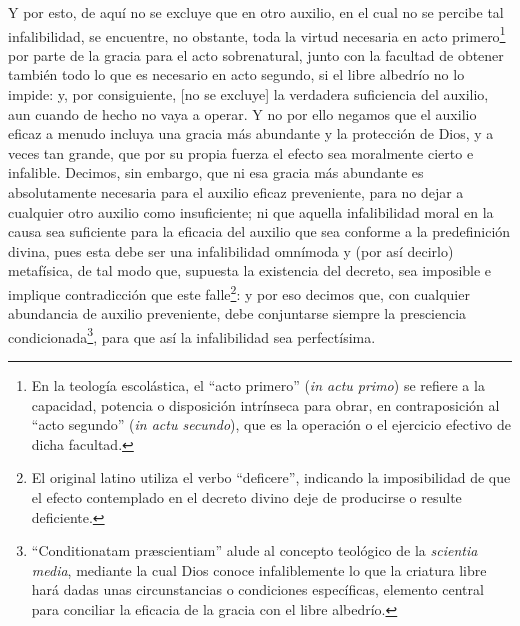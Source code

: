 \documentclass{article}
\begin{document}
Y por esto, de aquí no se excluye que en otro auxilio, en el cual no se percibe tal
infalibilidad, se encuentre, no obstante, toda la virtud necesaria en acto
primero\footnote{En la teología escolástica, el \enquote{acto primero} (\textit{in actu
primo}) se refiere a la capacidad, potencia o disposición intrínseca para obrar, en
contraposición al \enquote{acto segundo} (\textit{in actu secundo}), que es la operación
o el ejercicio efectivo de dicha facultad.} por parte de la gracia para el acto
sobrenatural, junto con la facultad de obtener también todo lo que es necesario en acto
segundo, si el libre albedrío no lo impide: y, por consiguiente, [no se excluye] la
verdadera suficiencia del auxilio, aun cuando de hecho no vaya a operar. Y no por ello
negamos que el auxilio eficaz a menudo incluya una gracia más abundante y la protección
de Dios, y a veces tan grande, que por su propia fuerza el efecto sea moralmente cierto
e infalible. Decimos, sin embargo, que ni esa gracia más abundante es absolutamente
necesaria para el auxilio eficaz preveniente, para no dejar a cualquier otro auxilio
como insuficiente; ni que aquella infalibilidad moral en la causa sea suficiente para la
eficacia del auxilio que sea conforme a la predefinición divina, pues esta debe ser una
infalibilidad omnímoda y (por así decirlo) metafísica, de tal modo que, supuesta la
existencia del decreto, sea imposible e implique contradicción que este
falle\footnote{El original latino utiliza el verbo \enquote{deficere}, indicando la
imposibilidad de que el efecto contemplado en el decreto divino deje de producirse o
resulte deficiente.}: y por eso decimos que, con cualquier abundancia de auxilio
preveniente, debe conjuntarse siempre la presciencia
condicionada\footnote{\enquote{Conditionatam præscientiam} alude al concepto teológico
de la \textit{scientia media}, mediante la cual Dios conoce infaliblemente lo que la
criatura libre hará dadas unas circunstancias o condiciones específicas, elemento
central para conciliar la eficacia de la gracia con el libre albedrío.}, para que así la
infalibilidad sea perfectísima.
\end{document}
